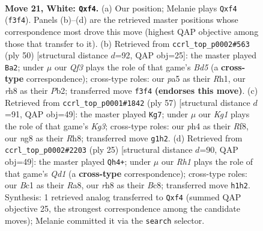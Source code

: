 \documentclass[11pt]{article}
\begin{document}
\clearpage

\begin{figure}[p]\centering
\begin{subfigure}{0.46\textwidth}\centering
\resizebox{\linewidth}{!}{%
\newchessgame
\chessboard[
  setfen={r2k1bnr/1b2q3/8/pBp1Pp2/3p1p1p/NP3Q1P/P5P1/R1B3KR w - - 4 21},
  showmover=false,
  pgfstyle=straightmove, color=movearrow, markmove={f3-f4}
]}
\caption{}
\end{subfigure}\hfill
\begin{subfigure}{0.46\textwidth}\centering
\resizebox{\linewidth}{!}{%
\newchessgame
\chessboard[
  setfen={1rbq1rk1/5p2/p2p2p1/p2B3p/4PPnP/2NQ2P1/1P1R4/2K4R w - - 0 26},
  showmover=false,
  pgfstyle=straightmove, color=movearrow, markmove={d5-a2}
]}
\caption{}
\end{subfigure}
\\[4pt]
\begin{subfigure}{0.46\textwidth}\centering
\resizebox{\linewidth}{!}{%
\newchessgame
\chessboard[
  setfen={5r1r/p2b4/1p1p1nk1/2pPq1p1/2P1p3/P1N1P3/1PQ1B1P1/2K2RR1 b - - 11 29},
  showmover=false,
  pgfstyle=straightmove, color=movearrow, markmove={g6-g7}
]}
\caption{}
\end{subfigure}\hfill
\begin{subfigure}{0.46\textwidth}\centering
\resizebox{\linewidth}{!}{%
\newchessgame
\chessboard[
  setfen={r1bqk2r/5ppp/p1p1p3/3nP3/Pb2N3/2P5/1P2B1PP/R1BQK2R b KQkq - 0 13},
  showmover=false,
  pgfstyle=straightmove, color=movearrow, markmove={d8-h4}
]}
\caption{}
\end{subfigure}
\caption{\textbf{Move 21, White: \texttt{Qxf4}.} (a) Our position; Melanie plays \texttt{Qxf4} (\texttt{f3f4}). Panels (b)--(d) are the retrieved master positions whose correspondence most drove this move (highest QAP objective among those that transfer to it). (b) Retrieved from \texttt{ccrl\_top\_p0002\#563} (ply 50) [structural distance $d$=92, QAP obj=25]: the master played \texttt{Ba2}; under $\mu$ our \emph{Qf3} plays the role of that game's \emph{Bd5} (a \textbf{cross-type} correspondence); cross-type roles: our \emph{p}a5 as their \emph{R}h1, our \emph{r}h8 as their \emph{P}b2; transferred move \texttt{f3f4} \textbf{(endorses this move)}. (c) Retrieved from \texttt{ccrl\_top\_p0001\#1842} (ply 57) [structural distance $d$=91, QAP obj=49]: the master played \texttt{Kg7}; under $\mu$ our \emph{Kg1} plays the role of that game's \emph{Kg3}; cross-type roles: our \emph{p}h4 as their \emph{R}f8, our \emph{n}g8 as their \emph{R}h8; transferred move \texttt{g1h2}. (d) Retrieved from \texttt{ccrl\_top\_p0002\#2203} (ply 25) [structural distance $d$=90, QAP obj=49]: the master played \texttt{Qh4+}; under $\mu$ our \emph{Rh1} plays the role of that game's \emph{Qd1} (a \textbf{cross-type} correspondence); cross-type roles: our \emph{B}c1 as their \emph{R}a8, our \emph{r}h8 as their \emph{B}c8; transferred move \texttt{h1h2}. Synthesis: 1 retrieved analog transferred to \texttt{Qxf4} (summed QAP objective 25, the strongest correspondence among the candidate moves); Melanie committed it via the \texttt{search} selector.}
\label{fig:thought-m40}
\end{figure}
\end{document}
